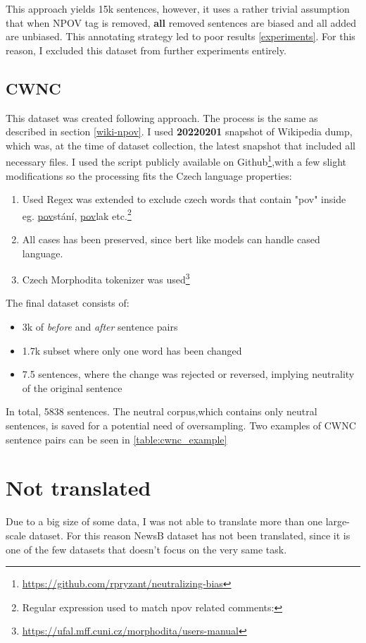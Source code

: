This approach yields 15k sentences, however, it uses a rather trivial assumption that when NPOV tag is removed, \textbf{all} removed sentences are biased and all added are unbiased. This annotating strategy led to poor results \ref{experiments}. For this reason, I excluded this dataset from further experiments entirely.





\subsection{CWNC}\label{wncs}
This dataset was created following \cite{pryzant2020automatically} approach. The process is the same as described in section \ref{wiki-npov}. I used \textbf{20220201} snapshot of Wikipedia dump, which was, at the time of dataset collection, the latest snapshot that included all necessary files.
I used the script publicly available on Github\footnote{\url{https://github.com/rpryzant/neutralizing-bias}},with a few slight modifications so the processing fits the Czech language properties:
\begin{enumerate}
    \item Used Regex was extended to exclude czech words that contain "pov" inside eg. \underline{pov}stání, \underline{pov}lak etc.\footnote{Regular expression used to match npov related comments: }
    \item All cases has been preserved, since bert like models can handle cased language.
    \item Czech Morphodita tokenizer was used\footnote{\url{https://ufal.mff.cuni.cz/morphodita/users-manual}}
\end{enumerate}
The final dataset consists of:
\begin{itemize}
    \item 3k of \textit{before} and \textit{after} sentence pairs
    \item 1.7k subset where only one word has been changed
    \item 7.5 sentences, where the change was rejected or reversed, implying neutrality of the original sentence
\end{itemize}




In total, 5838 sentences. The neutral corpus,which contains only neutral sentences, is saved for a potential need of oversampling. Two examples of CWNC sentence pairs can be seen in \ref{table:cwnc_example}





\section{Not translated}
Due to a big size of some data, I was not able to translate more than one large-scale dataset. For this reason NewsB dataset has not been translated, since it is one of the few datasets that doesn't focus on the very same task.
